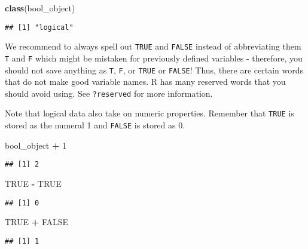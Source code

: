 \documentclass[]{article}
\newenvironment{Shaded}{\begin{snugshade}}{\end{snugshade}}
\newcommand{\KeywordTok}[1]{\textcolor[rgb]{0.13,0.29,0.53}{\textbf{#1}}}
\newcommand{\DecValTok}[1]{\textcolor[rgb]{0.00,0.00,0.81}{#1}}
\newcommand{\StringTok}[1]{\textcolor[rgb]{0.31,0.60,0.02}{#1}}
\newcommand{\OtherTok}[1]{\textcolor[rgb]{0.56,0.35,0.01}{#1}}
\newcommand{\OperatorTok}[1]{\textcolor[rgb]{0.81,0.36,0.00}{\textbf{#1}}}
\newcommand{\NormalTok}[1]{#1}
\begin{document}
\begin{Shaded}
\begin{Highlighting}[]
\KeywordTok{class}\NormalTok{(bool_object)}
\end{Highlighting}
\end{Shaded}

\begin{verbatim}
## [1] "logical"
\end{verbatim}

We recommend to always spell out \texttt{TRUE} and \texttt{FALSE}
instead of abbreviating them \texttt{T} and \texttt{F} which might be
mistaken for previously defined variables - therefore, you should not
save anything as \texttt{T}, \texttt{F}, or \texttt{TRUE} or
\texttt{FALSE}! Thus, there are certain words that do not make good
variable names. R has many reserved words that you should avoid using.
See \texttt{?reserved} for more information.

Note that logical data also take on numeric properties. Remember that
\texttt{TRUE} is stored as the numeral 1 and \texttt{FALSE} is stored as
0.

\begin{Shaded}
\begin{Highlighting}[]
\NormalTok{bool_object }\OperatorTok{+}\StringTok{ }\DecValTok{1}
\end{Highlighting}
\end{Shaded}

\begin{verbatim}
## [1] 2
\end{verbatim}

\begin{Shaded}
\begin{Highlighting}[]
\OtherTok{TRUE} \OperatorTok{-}\StringTok{ }\OtherTok{TRUE}
\end{Highlighting}
\end{Shaded}

\begin{verbatim}
## [1] 0
\end{verbatim}

\begin{Shaded}
\begin{Highlighting}[]
\OtherTok{TRUE} \OperatorTok{+}\StringTok{ }\OtherTok{FALSE}
\end{Highlighting}
\end{Shaded}

\begin{verbatim}
## [1] 1
\end{verbatim}
\end{document}
